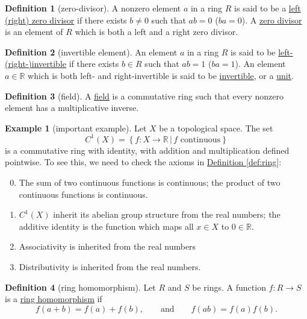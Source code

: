 \documentclass[a4paper,10pt]{scrreprt}
\newcommand{\R}{\mathbb{R}}
\newcommand{\defn}[1]{\ul{#1}}
\theoremstyle{definition}
\newtheorem{definition}{Definition}[section]
\newtheorem{example}{Example}[section]
\theoremstyle{plain}
\theoremstyle{remark}
\begin{document}
\begin{definition}[zero-divisor]
  \label{def:zerodivisor}
  A nonzero element $a$ in a ring $R$ is said to be a \defn{left (right) zero divisor} if there exists $b \neq 0$ such that $ab=0$ ($ba=0$). A \defn{zero divisor} is an element of $R$ which is both a left and a right zero divisor.
\end{definition}

\begin{definition}[invertible element]
  \label{def:ringinvertible}
  An element $a$ in a ring $R$ is said to be \defn{left- (right-)invertible} if there exists $b \in R$ such that $ab=1$ ($ba=1$). An element $a \in \R$ which is both left- and right-invertible is said to be \defn{invertible}, or a \defn{unit}.
\end{definition}

\begin{definition}[field]
  \label{def:field}
  A \defn{field} is a commutative ring such that every nonzero element has a multiplicative inverse.
\end{definition}

\begin{example}[important example]
  Let $X$ be a topological space. The set
  \begin{equation*}
    C^{1}(X) = \left\{ f\colon X \to \R\,\big|\, f \text{ continuous} \right\}
  \end{equation*}
  is a commutative ring with identity, with addition and multiplication defined pointwise. To see this, we need to check the axioms in \hyperref[def:ring]{Definition \ref*{def:ring}}:
  \begin{enumerate}
      \setcounter{enumi}{-1}
    \item The sum of two continuous functions is continuous; the product of two continuous functions is continuous.
    \item $C^{1}(X)$ inherit its abelian group structure from the real numbers; the additive identity is the function which maps all $x \in X$ to $0 \in \R$.
    \item Associativity is inherited from the real numbers
    \item Distributivity is inherited from the real numbers.
  \end{enumerate}
\end{example}

\begin{definition}[ring homomorphism]
  \label{def:ringhomomorphism}
  Let $R$ and $S$ be rings. A function $f\colon R \to S$ is a \defn{ring homomorphism} if
  \begin{equation*}
    f(a+b) = f(a) + f(b), \qquad \text{and}\qquad f(ab) = f(a)f(b).
  \end{equation*}
\end{definition}
\end{document}
